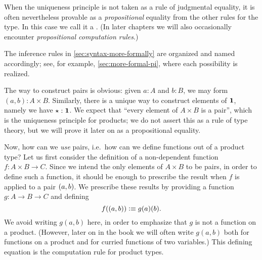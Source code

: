 \begin{rmk}
\begin{enumerate}
    When the uniqueness principle is not taken as a rule of judgmental equality, it is often nevertheless provable as a \emph{propositional} equality from the other rules for the type.
    In this case we call it a .
    (In later chapters we will also occasionally encounter \emph{propositional computation rules}.)
  \end{enumerate}
The inference rules in \autoref{sec:syntax-more-formally} are organized and named accordingly; see, for example, \autoref{sec:more-formal-pi}, where each possibility is realized.
\end{rmk}

The way to construct pairs is obvious: given $a:A$ and $b:B$, we may form $(a,b):A\times B$.
Similarly, there is a unique way to construct elements of $\mathbf{1}$, namely we have $\star:\mathbf{1}$.
We expect that ``every element of $A\times B$ is a pair'', which is the uniqueness principle for products; we do not assert this as a rule of type theory, but we will prove it later on as a propositional equality.

Now, how can we \emph{use} pairs, i.e.\ how can we define functions out of a product type?
Let us first consider the definition of a non-dependent function $f : A\times B \to C$.
Since we intend the only elements of $A\times B$ to be pairs, in order to define such a function, it should be enough to prescribe the result
when $f$ is applied to a pair $(a,b)$.  We prescribe these results by
providing a function $g : A \to B \to C$ and defining 
\[ f((a,b)) \vcentcolon\equiv g(a)(b). \]
We avoid writing $g(a,b)$ here, in order to emphasize that $g$ is not a
function on a product.
(However, later on in the book we will often write $g(a,b)$ both for functions on a product and for curried functions of two variables.)
This defining equation is the computation rule for product types.

